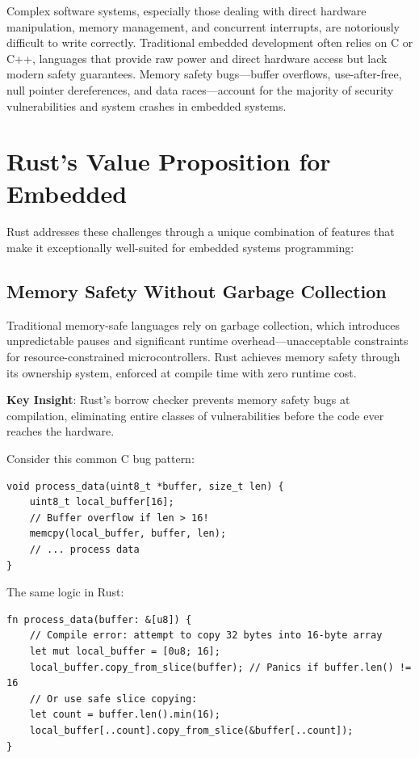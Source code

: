 
Complex software systems, especially those dealing with direct hardware manipulation, memory management, and concurrent interrupts, are notoriously difficult to write correctly. Traditional embedded development often relies on C or C++, languages that provide raw power and direct hardware access but lack modern safety guarantees. Memory safety bugs---buffer overflows, use-after-free, null pointer dereferences, and data races---account for the majority of security vulnerabilities and system crashes in embedded systems.

\section{Rust's Value Proposition for Embedded}
\label{sec:why-rust-value-prop}

Rust addresses these challenges through a unique combination of features that make it exceptionally well-suited for embedded systems programming:

\subsection{Memory Safety Without Garbage Collection}

Traditional memory-safe languages rely on garbage collection, which introduces unpredictable pauses and significant runtime overhead---unacceptable constraints for resource-constrained microcontrollers. Rust achieves memory safety through its ownership system, enforced at compile time with zero runtime cost.

\begin{notebox}
    \textbf{Key Insight}: Rust's borrow checker prevents memory safety bugs at compilation, eliminating entire classes of vulnerabilities before the code ever reaches the hardware.
\end{notebox}

Consider this common C bug pattern:

\begin{verbatim}
void process_data(uint8_t *buffer, size_t len) {
    uint8_t local_buffer[16];
    // Buffer overflow if len > 16!
    memcpy(local_buffer, buffer, len);
    // ... process data
}
\end{verbatim}

The same logic in Rust:

\begin{verbatim}
fn process_data(buffer: &[u8]) {
    // Compile error: attempt to copy 32 bytes into 16-byte array
    let mut local_buffer = [0u8; 16];
    local_buffer.copy_from_slice(buffer); // Panics if buffer.len() != 16
    // Or use safe slice copying:
    let count = buffer.len().min(16);
    local_buffer[..count].copy_from_slice(&buffer[..count]);
}
\end{verbatim}

